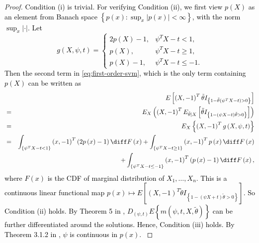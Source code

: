 \begin{proof}
\textcolor{black}{Condition (i) is trivial. For verifying Condition
(ii), we first view $p\left(X\right)$ as an element from Banach space
$\left\{ p\left(x\right):\sup_{x}\left|p\left(x\right)\right|<\infty\right\} $,
with the norm $\sup_{x}\left|\cdot\right|$. Let 
\[
g\left(X,\psi,t\right)=\begin{cases}
2p\left(X\right)-1, & \psi^{T}X-t<1,\\
p\left(X\right), & \psi^{T}X-t\ge1,\\
p\left(X\right)-1, & \psi^{T}X-t\le-1.
\end{cases}
\]
Then the second term in \ref{eq:first-order-svm}, which is the only
term containing $p\left(X\right)$ can be written as 
\begin{eqnarray*}
 &  & E\left[\left(X,-1\right)^{T}\tilde{\theta}I_{\left\{ 1-\tilde{\theta}\left(\psi^{T}X-t\right)>0\right\} }\right]\\
 & = & E_{X}\left(\left(X,-1\right)^{T}E_{\tilde{\theta}\mid X}\left[\tilde{\theta}I_{\left\{ 1-\left(\psi X-t\right)\tilde{\theta}>0\right\} }\right]\right)\\
 & = & E_{X}\left\{ \left(X,-1\right)^{T}g\left(X,\psi,t\right)\right\} \\
 & = & \int_{\left\{ \psi^{T}X-t<1\right\} }\left(x,-1\right)^{T}\left(2p\left(x\right)-1\right)\diff F\left(x\right)+\int_{\left\{ \psi^{T}X-t\ge1\right\} }\left(x,-1\right)^{T}p\left(x\right)\diff F\left(x\right)\\
 &  & +\int_{\left\{ \psi^{T}X-t\le-1\right\} }\left(x,-1\right)^{T}\left(p\left(x\right)-1\right)\diff F\left(x\right),
\end{eqnarray*}
where $F\left(x\right)$ is the CDF of marginal distribution of $X_{1},\ldots,X_{n}$.
This is a continuous linear functional map $p\left(x\right)\mapsto E\left[\left(X,-1\right)^{T}\tilde{\theta}I_{\left\{ 1-\left(\psi X+t\right)\tilde{\theta}>0\right\} }\right]$.
So Condition (ii) holds. By Theorem 5 in \cite{li2011principal},
$D_{\left(\psi,t\right)}E\left\{ m\left(\psi,t,X,\tilde{\theta}\right)\right\} $
can be further differentiated around the solutions. Hence, Condition
(iii) holds. By Theorem 3.1.2 in \cite{lebedev2003functional}, $\psi$
is continuous in $p\left(x\right)$. }


\end{proof}

